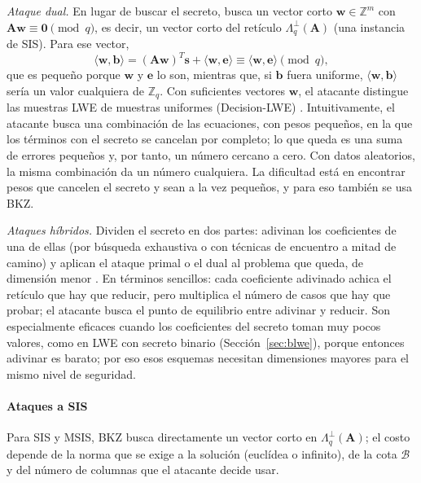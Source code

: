 \textit{Ataque dual.} En lugar de buscar el secreto, busca un vector corto $\mathbf{w} \in \mathbb{Z}^m$ con $\mathbf{A}\mathbf{w} \equiv \mathbf{0} \pmod q$, es decir, un vector corto del retículo $\Lambda_q^\perp(\mathbf{A})$ (una instancia de SIS). Para ese vector,
\begin{equation}
\langle \mathbf{w}, \mathbf{b} \rangle = (\mathbf{A}\mathbf{w})^T \mathbf{s} + \langle \mathbf{w}, \mathbf{e} \rangle \equiv \langle \mathbf{w}, \mathbf{e} \rangle \pmod q,
\end{equation}
que es pequeño porque $\mathbf{w}$ y $\mathbf{e}$ lo son, mientras que, si $\mathbf{b}$ fuera uniforme, $\langle \mathbf{w}, \mathbf{b} \rangle$ sería un valor cualquiera de $\mathbb{Z}_q$. Con suficientes vectores $\mathbf{w}$, el atacante distingue las muestras LWE de muestras uniformes (Decision-LWE) \cite{albrecht2015concrete}. Intuitivamente, el atacante busca una combinación de las ecuaciones, con pesos pequeños, en la que los términos con el secreto se cancelan por completo; lo que queda es una suma de errores pequeños y, por tanto, un número cercano a cero. Con datos aleatorios, la misma combinación da un número cualquiera. La dificultad está en encontrar pesos que cancelen el secreto y sean a la vez pequeños, y para eso también se usa BKZ.

\textit{Ataques híbridos.} Dividen el secreto en dos partes: adivinan los coeficientes de una de ellas (por búsqueda exhaustiva o con técnicas de encuentro a mitad de camino) y aplican el ataque primal o el dual al problema que queda, de dimensión menor \cite{latticeestimator}. En términos sencillos: cada coeficiente adivinado achica el retículo que hay que reducir, pero multiplica el número de casos que hay que probar; el atacante busca el punto de equilibrio entre adivinar y reducir. Son especialmente eficaces cuando los coeficientes del secreto toman muy pocos valores, como en LWE con secreto binario (Sección~\ref{sec:blwe}), porque entonces adivinar es barato; por eso esos esquemas necesitan dimensiones mayores para el mismo nivel de seguridad.

\paragraph{Ataques a SIS}
Para SIS y MSIS, BKZ busca directamente un vector corto en $\Lambda_q^\perp(\mathbf{A})$; el costo depende de la norma que se exige a la solución (euclídea o infinito), de la cota $\mathcal{B}$ y del número de columnas que el atacante decide usar.

